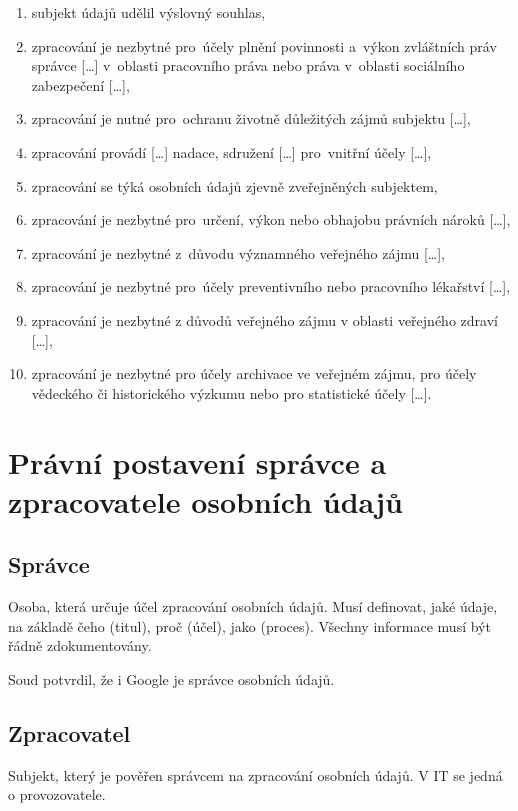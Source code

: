\begin{enumerate}[label=\alph*)]
\item subjekt údajů udělil výslovný souhlas,
\item zpracování je nezbytné pro~účely plnění povinnosti a~výkon zvláštních práv správce [\dots] v~oblasti pracovního práva nebo práva v~oblasti sociálního zabezpečení [\dots],
\item zpracování je nutné pro~ochranu životně důležitých zájmů subjektu [\dots],
\item zpracování provádí [\dots] nadace, sdružení [\dots] pro~vnitřní účely [\dots],
\item zpracování se týká osobních údajů zjevně zveřejněných subjektem,
\item zpracování je nezbytné pro~určení, výkon nebo obhajobu právních nároků [\dots],
\item zpracování je nezbytné z~důvodu významného veřejného zájmu [\dots],
\item zpracování je nezbytné pro~účely preventivního nebo pracovního lékařství [\dots],
\item zpracování je nezbytné z důvodů veřejného zájmu v oblasti veřejného zdraví [\dots],
\item zpracování je nezbytné pro účely archivace ve veřejném zájmu, pro účely vědeckého či historického výzkumu nebo pro statistické účely [\dots].
\end{enumerate}

\clearpage
\section{Právní postavení správce a zpracovatele osobních údajů}
\subsection*{Správce}
Osoba, která určuje účel zpracování osobních údajů. Musí definovat, jaké údaje, na základě čeho (titul), proč (účel), jako (proces). Všechny informace musí být řádně zdokumentovány.

Soud potvrdil, že i Google je správce osobních údajů.

\subsection*{Zpracovatel}
Subjekt, který je  pověřen správcem na zpracování osobních údajů. V IT se jedná o provozovatele.

\clearpage
